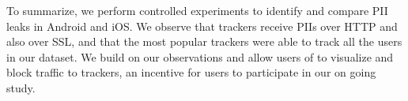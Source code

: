 To summarize, we perform controlled experiments to identify and compare PII leaks in Android and iOS. 
We observe that trackers receive PIIs over HTTP and also over SSL, and that the most popular trackers were able to track all the users in our \mobWild dataset.
We build on our observations and allow users of \meddle to visualize and block traffic to trackers, an incentive for users to participate in our on going study. 







